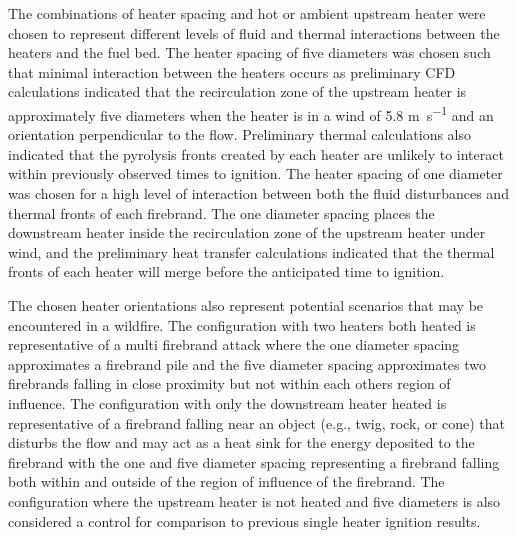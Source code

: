     The combinations of heater spacing and hot or ambient upstream heater were chosen to represent different levels of fluid and thermal interactions between the heaters and the fuel bed. The heater spacing of five diameters was chosen such that minimal interaction between the heaters occurs as preliminary CFD calculations indicated that the recirculation zone of the upstream heater is approximately five diameters when the heater is in a wind of 5.8 \si{\meter\per\second} and an orientation perpendicular to the flow. Preliminary thermal calculations also indicated that the pyrolysis fronts created by each heater are unlikely to interact within previously observed times to ignition. The heater spacing of one diameter was chosen for a high level of interaction between both the fluid disturbances and thermal fronts of each firebrand. The one diameter spacing places the downstream heater inside the recirculation zone of the upstream heater under wind, and the preliminary heat transfer calculations indicated that the thermal fronts of each heater will merge before the anticipated time to ignition.
    
    The chosen heater orientations also represent potential scenarios that may be encountered in a wildfire. The configuration with two heaters both heated is representative of a multi firebrand attack where the one diameter spacing approximates a firebrand pile and the five diameter spacing approximates two firebrands falling in close proximity but not within each others region of influence. The configuration with only the downstream heater heated is representative of a firebrand falling near an object (e.g., twig, rock, or cone) that disturbs the flow and may act as a heat sink for the energy deposited to the firebrand with the one and five diameter spacing representing a firebrand falling both within and outside of the region of influence of the firebrand. The configuration where the upstream heater is not heated and five diameters is also considered a control for comparison to previous single heater ignition results.
    
